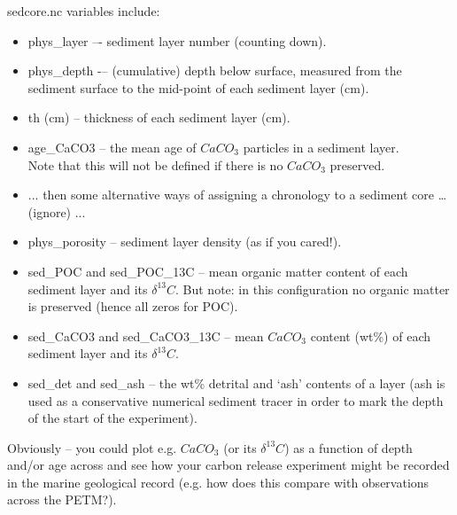 \documentclass[11pt,fleqn]{book} %
\begin{document}
\pagebreak

\textsf{\footnotesize sedcore.nc } variables include:

\vspace{1mm}
\begin{itemize}[noitemsep]
\item \textsf{\footnotesize phys\_layer } –- sediment layer number (counting down).
\item \textsf{\footnotesize phys\_depth } -– (cumulative) depth below surface, measured from the sediment surface to the mid-point of each sediment layer (cm).
\item \textsf{\footnotesize th (cm) } -- thickness of each sediment layer (cm).
\item \textsf{\footnotesize age\_CaCO3 } -- the mean age of \(CaCO_{3}\) particles in a sediment layer.
\\Note that this will not be defined if there is no \(CaCO_{3}\) preserved.
\item \textsf{\footnotesize ... } then some alternative ways of assigning a chronology to a sediment core … (ignore) ...
\item \textsf{\footnotesize phys\_porosity  } -- sediment layer density (as if you cared!).
\item \textsf{\footnotesize sed\_POC } and \textsf{\footnotesize sed\_POC\_13C } -- mean organic matter content of each sediment layer and its \(\delta^{13} C\). But note: in this configuration no organic matter is preserved (hence all zeros for POC).
\item \textsf{\footnotesize sed\_CaCO3} and \textsf{\footnotesize sed\_CaCO3\_13C } -- mean \(CaCO_{3}\) content (wt\%) of each sediment layer and its \(\delta^{13} C\).
\item \textsf{\footnotesize sed\_det } and \textsf{\footnotesize sed\_ash } -- the wt\% detrital and ‘ash’ contents of a layer (ash is used as a conservative numerical sediment tracer in order to mark the depth of the start of the experiment).
\end{itemize}
\vspace{1mm}

Obviously – you could plot e.g. \(CaCO_{3}\) (or its \(\delta^{13}C\)) as a function of depth and/or age across and see how your carbon release experiment might be recorded in the marine geological record (e.g. how does this compare with observations across the PETM?).
\end{document}
